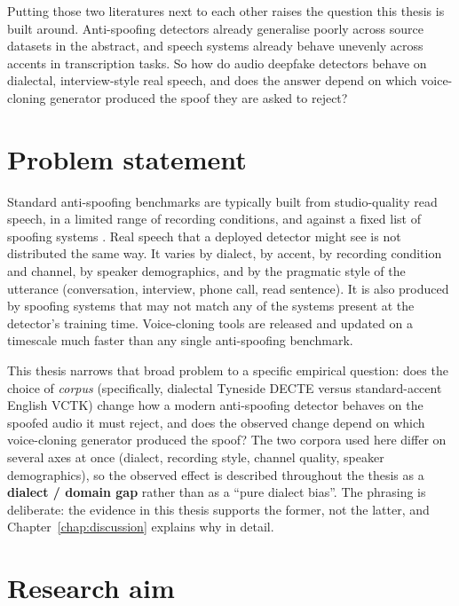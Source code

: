 Putting those two literatures next to each other raises the
question this thesis is built around. Anti-spoofing detectors
already generalise poorly across source datasets in the abstract,
and speech systems already behave unevenly across accents in
transcription tasks. So how do audio deepfake detectors behave on
dialectal, interview-style real speech, and does the answer depend
on which voice-cloning generator produced the spoof they are asked
to reject?


\section{Problem statement}
\label{sec:introduction-problem}

Standard anti-spoofing benchmarks are typically built from
studio-quality read speech, in a limited range of recording
conditions, and against a fixed list of spoofing systems
\cite{Todisco2019_ASVspoof} \cite{ASVspoof2019_Database}. Real
speech that a deployed detector might see is not distributed the
same way. It varies by dialect, by accent, by recording condition
and channel, by speaker demographics, and by the pragmatic style of
the utterance (conversation, interview, phone call, read
sentence). It is also produced by spoofing systems that may not
match any of the systems present at the detector's training time.
Voice-cloning tools are released and updated on a timescale much
faster than any single anti-spoofing benchmark.

This thesis narrows that broad problem to a specific empirical
question: does the choice of \emph{corpus} (specifically, dialectal
Tyneside DECTE versus standard-accent English VCTK) change how a
modern anti-spoofing detector behaves on the spoofed audio it must
reject, and does the observed change depend on which voice-cloning
generator produced the spoof? The two corpora used here differ on
several axes at once (dialect, recording style, channel quality,
speaker demographics), so the observed effect is described
throughout the thesis as a \textbf{dialect / domain gap} rather than
as a ``pure dialect bias''. The phrasing is deliberate: the
evidence in this thesis supports the former, not the latter, and
Chapter~\ref{chap:discussion} explains why in detail.


\section{Research aim}
\label{sec:introduction-aim}

